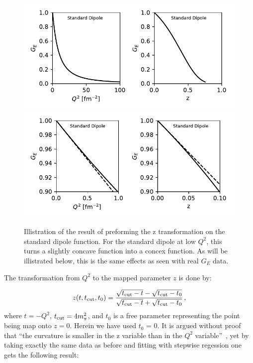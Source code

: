 \documentclass[10pt,aps,prc,twocolumn]{revtex4-1}
\begin{document}
\begin{appendix}
\begin{figure}
\includegraphics[width=\columnwidth]{Figure/z-q2-sd.pdf}
\includegraphics[width=\columnwidth]{Figure/z-q2-sd-zoomed.pdf}
\caption{Illistration of the result of preforming the z transformation on the standard dipole function. 
For the standard dipole at low $Q^2$, this turns a slightly concave function into a concex function.
As will be illistrated below, this is the same effects as seen with real $G_E$ data.}
\end{figure}

The transformation from $Q^2$ to the mapped parameter $z$ is done by:

\begin{equation}
z(t,t_{\rm cut},t_0) = {\sqrt{t_{\rm cut} - t} - \sqrt{t_{\rm cut} - t_0} \over \sqrt{t_{\rm cut} - t} + \sqrt{t_{\rm cut} - t_0}  } \,,  
\end{equation}
where $t=-Q^2$, $t_{\rm cut} = 4m_\pi^2$, and $t_0$ is a free parameter 
representing the point being map onto $z=0$.   
Herein we have used $t_0$ = 0.  
It is argued without proof that ``the curvature is smaller in the
z variable than in the $Q^2$ variable''~\cite{Hill:2010yb}, yet by taking 
exactly the same data as before and fitting with stepwise regession
one gets the following result:


\end{appendix}
\end{document}
